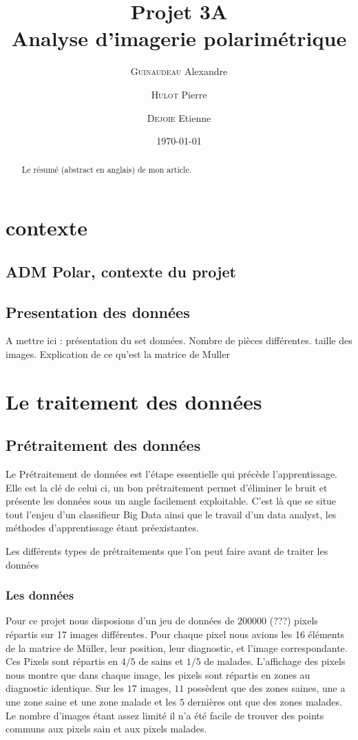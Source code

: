 \documentclass[a4paper,10pt]{report}
\title{Projet 3A\\Analyse d'imagerie polarimétrique}
\author{\textsc{Guinaudeau} Alexandre\\
	\and 
	\textsc{Hulot} Pierre
	\and 
	\textsc{Dejoie} Etienne	
	}
\date{\today}
\begin{document}
\maketitle

\begin{abstract}
Le résumé (abstract en anglais) de mon article.
\end{abstract}

\chapter{contexte}
\section{ADM Polar, contexte du projet}
\section{Presentation des données}
 A mettre ici : présentation du set données. Nombre de pièces différentes. taille des images. Explication de ce qu'est la matrice de Muller


\chapter{Le traitement des données}

\section{Prétraitement des données}
Le Prétraitement de données est l'étape essentielle qui précède l'apprentissage. Elle est la clé de celui ci, un bon prétraitement permet d'éliminer le bruit et présente les données sous un angle facilement exploitable. C'est là que se situe tout l'enjeu d'un classifieur Big Data ainsi que le travail d'un data analyst, les méthodes d'apprentissage étant préexistantes.  

Les différents types de prétraitements que l'on peut faire avant de traiter les données
\subsection{Les données}
Pour ce projet nous disposions d'un jeu de données de $200 000$ (???) pixels répartis sur 17 images différentes. Pour chaque pixel nous avions les 16 éléments de la matrice de Müller, leur position, leur diagnostic, et l'image correspondante.
Ces Pixels sont répartis en $4/5$ de sains et $1/5$ de malades. L'affichage des pixels nous montre que dans chaque image, les pixels sont répartis en zones au diagnostic identique. Sur les $17$ images, $11$ possèdent que des zones saines, une a une zone saine et une zone malade et les $5$ dernières ont que des zones malades. Le nombre d'images étant assez limité il n'a été facile de trouver des points communs aux pixels sain et aux pixels malades.
\end{document}
